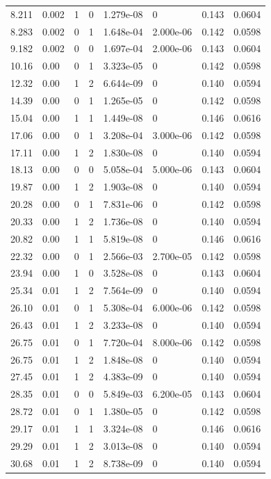 \documentclass[preview]{standalone}
\begin{document}
{{\begin{tabular}{L{1.2cm}C{1.2cm} C{0.3cm}C{0.5cm} C{1.4cm}C{1.4cm} C{1.4cm}C{1.4cm}}
  8.211  &  0.002  & 1     &  0 &  1.279e-08  & 0  & 0.143 &  0.0604   \\ 
  8.283  &  0.002  & 0     &  1 &  1.648e-04  & 2.000e-06  & 0.142 &  0.0598   \\ 
  9.182  &  0.002  & 0     &  0 &  1.697e-04  & 2.000e-06  & 0.143 &  0.0604   \\ 
  10.16  &  0.00  & 0     &  1 &  3.323e-05  & 0  & 0.142 &  0.0598   \\ 
  12.32  &  0.00  & 1     &  2 &  6.644e-09  & 0  & 0.140 &  0.0594   \\ 
  14.39  &  0.00  & 0     &  1 &  1.265e-05  & 0  & 0.142 &  0.0598   \\ 
  15.04  &  0.00  & 1     &  1 &  1.449e-08  & 0  & 0.146 &  0.0616   \\ 
  17.06  &  0.00  & 0     &  1 &  3.208e-04  & 3.000e-06  & 0.142 &  0.0598   \\ 
  17.11  &  0.00  & 1     &  2 &  1.830e-08  & 0  & 0.140 &  0.0594   \\ 
  18.13  &  0.00  & 0     &  0 &  5.058e-04  & 5.000e-06  & 0.143 &  0.0604   \\ 
  19.87  &  0.00  & 1     &  2 &  1.903e-08  & 0  & 0.140 &  0.0594   \\ 
  20.28  &  0.00  & 0     &  1 &  7.831e-06  & 0  & 0.142 &  0.0598   \\ 
  20.33  &  0.00  & 1     &  2 &  1.736e-08  & 0  & 0.140 &  0.0594   \\ 
  20.82  &  0.00  & 1     &  1 &  5.819e-08  & 0  & 0.146 &  0.0616   \\ 
  22.32  &  0.00  & 0     &  1 &  2.566e-03  & 2.700e-05  & 0.142 &  0.0598   \\ 
  23.94  &  0.00  & 1     &  0 &  3.528e-08  & 0  & 0.143 &  0.0604   \\ 
  25.34  &  0.01  & 1     &  2 &  7.564e-09  & 0  & 0.140 &  0.0594   \\ 
  26.10  &  0.01  & 0     &  1 &  5.308e-04  & 6.000e-06  & 0.142 &  0.0598   \\ 
  26.43  &  0.01  & 1     &  2 &  3.233e-08  & 0  & 0.140 &  0.0594   \\ 
  26.75  &  0.01  & 0     &  1 &  7.720e-04  & 8.000e-06  & 0.142 &  0.0598   \\ 
  26.75  &  0.01  & 1     &  2 &  1.848e-08  & 0  & 0.140 &  0.0594   \\ 
  27.45  &  0.01  & 1     &  2 &  4.383e-09  & 0  & 0.140 &  0.0594   \\ 
  28.35  &  0.01  & 0     &  0 &  5.849e-03  & 6.200e-05  & 0.143 &  0.0604   \\ 
  28.72  &  0.01  & 0     &  1 &  1.380e-05  & 0  & 0.142 &  0.0598   \\ 
  29.17  &  0.01  & 1     &  1 &  3.324e-08  & 0  & 0.146 &  0.0616   \\ 
  29.29  &  0.01  & 1     &  2 &  3.013e-08  & 0  & 0.140 &  0.0594   \\ 
  30.68  &  0.01  & 1     &  2 &  8.738e-09  & 0  & 0.140 &  0.0594   \\ 
\hline 
\end{tabular} 

}}
\end{document}
